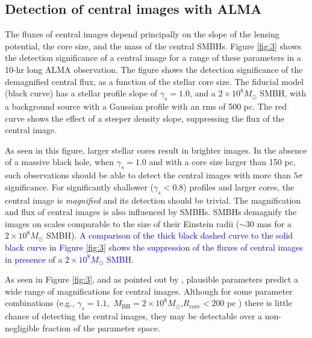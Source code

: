 \documentclass[chicago]{emulateapj}
\newcommand{\blue}{\textcolor{blue}}
\newcommand{\red}{\textcolor{red}}
\begin{document}
\subsection{Detection of central images with ALMA}
The fluxes of central images depend principally on the slope of the lensing potential, the core size, and the mass of the central SMBHs.  Figure \ref{fig:3} shows the detection significance of a central image for a range of these parameters in a 10-hr long ALMA observation. 
The figure shows the detection significance of the demagnified central flux, as a function of the stellar core size.
The fiducial model (black curve) has a stellar profile slope of $\gamma_s=1.0$, and a $2\times10^8M_{\odot}$ SMBH, with a background source 
with a Gaussian profile with an rms of 500 pc.  The red curve shows the effect of a steeper density slope, suppressing the flux of the central image. 




As seen in this figure, larger stellar cores result in brighter images. 
In the absence of a massive black hole, when $\gamma_s=1.0$ and with a core size larger than 150 pc, such observations should be able to detect the central images with more than $5\sigma$ significance. For significantly shallower ($\gamma_s<0.8$) profiles and larger cores, the central image is \emph{magnified} and its detection should be trivial.  The magnification and flux of central images is also influenced by SMBHs.
SMBHs demagnify the images on scales comparable to the size of their Einstein radii ($\sim30$ mas for a $2\times10^8M_{\odot}$ SMBH).
\blue{A comparison of the thick black dashed curve to the solid black curve in Figure \ref{fig:3} shows the suppression of the fluxes of central images in presence of a $2\times10^8M_{\odot}$ SMBH.}

As seen in Figure \ref{fig:3}, and as pointed out by \citet{Keeton:03}, plausible parameters predict  a wide range of magnifications for   central images. Although for some parameter combinations (e.g., $\gamma_{s}=1.1,$ $M_{\mathrm{BH}} = 2\times10^8 M_{\odot}$,$R_{\mathrm{core}}<200$ pc ) there is little chance of detecting the central images, they may be detectable over a non-negligible fraction of the parameter space.
\end{document}
